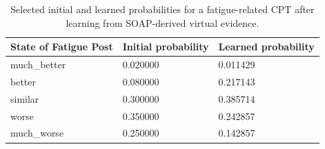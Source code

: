 \begin{table}
\caption{Selected initial and learned probabilities for a fatigue-related CPT after learning from SOAP-derived virtual evidence.}
\label{tab:learned_fatigue_cpt}
\begin{tabular}{lll}
\toprule
State of Fatigue Post & Initial probability & Learned probability \\
\midrule
much\_better & 0.020000 & 0.011429 \\
better & 0.080000 & 0.217143 \\
similar & 0.300000 & 0.385714 \\
worse & 0.350000 & 0.242857 \\
much\_worse & 0.250000 & 0.142857 \\
\bottomrule
\end{tabular}
\end{table}
